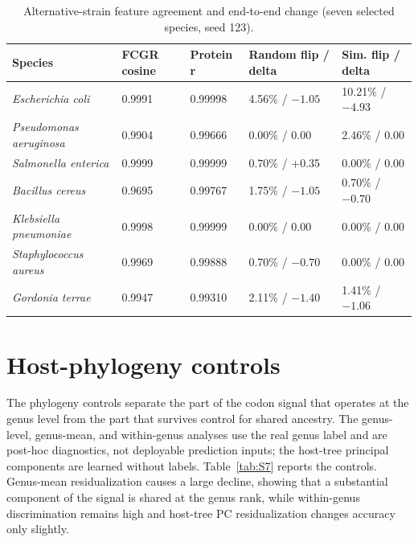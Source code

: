 \documentclass[utf8]{frontiers_suppmat}
\begin{document}
\begin{table}[ht]
\centering
\renewcommand{\arraystretch}{1.25}
\caption{Alternative-strain feature agreement and end-to-end change (seven selected species, seed 123).}\label{tab:S6}
\footnotesize
\begin{tabular}{l l l l l}
\hline
Species & FCGR cosine & Protein r & Random flip / delta & Sim. flip / delta \\
\hline
\textit{Escherichia coli} & 0.9991 & 0.99998 & 4.56\% / $-1.05$ & 10.21\% / $-4.93$ \\
\textit{Pseudomonas aeruginosa} & 0.9904 & 0.99666 & 0.00\% / 0.00 & 2.46\% / 0.00 \\
\textit{Salmonella enterica} & 0.9999 & 0.99999 & 0.70\% / +0.35 & 0.00\% / 0.00 \\
\textit{Bacillus cereus} & 0.9695 & 0.99767 & 1.75\% / $-1.05$ & 0.70\% / $-0.70$ \\
\textit{Klebsiella pneumoniae} & 0.9998 & 0.99999 & 0.00\% / 0.00 & 0.00\% / 0.00 \\
\textit{Staphylococcus aureus} & 0.9969 & 0.99888 & 0.70\% / $-0.70$ & 0.00\% / 0.00 \\
\textit{Gordonia terrae} & 0.9947 & 0.99310 & 2.11\% / $-1.40$ & 1.41\% / $-1.06$ \\
\hline
\end{tabular}
\end{table}

\section{Host-phylogeny controls}

The phylogeny controls separate the part of the codon signal that operates at the genus level
from the part that survives control for shared ancestry. The genus-level, genus-mean, and
within-genus analyses use the real genus label and are post-hoc diagnostics, not deployable
prediction inputs; the host-tree principal components are learned without labels.
Table~\ref{tab:S7} reports the controls. Genus-mean residualization causes a large decline,
showing that a substantial component of the signal is shared at the genus rank, while
within-genus discrimination remains high and host-tree PC residualization changes accuracy
only slightly.
\end{document}
